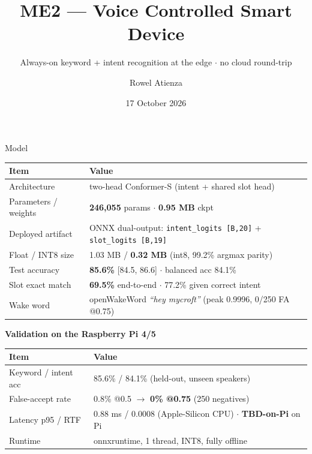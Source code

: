 \documentclass[aspectratio=169,10pt]{beamer}
\title[ME2 VCM]{ME2 --- Voice Controlled Smart Device}
\subtitle{Always-on keyword + intent recognition at the edge $\cdot$ no cloud round-trip}
\author{Rowel Atienza}
\date{17 October 2026}
\institute{Model \& Dataset \& Training on NVIDIA A100 \& Validation on RPi 4/5}
\newcommand{\TBD}{\textcolor{tbdgray}{\textbf{TBD-on-Pi}}}
\begin{document}
\begin{frame}{Model}
\small
\begin{table}
\centering
\begin{tabular}{@{}ll@{}}
\toprule
\textbf{Item} & \textbf{Value} \\
\midrule
Architecture & two-head Conformer-S (intent + shared slot head) \\
Parameters / weights & \textbf{246,055} params $\cdot$ \textbf{0.95 MB} ckpt \\
Deployed artifact & ONNX dual-output: \texttt{intent\_logits [B,20]} + \texttt{slot\_logits [B,19]} \\
Float / INT8 size & 1.03 MB / \textbf{0.32 MB} (int8, 99.2\% argmax parity) \\
Test accuracy & \textbf{85.6\%} [84.5, 86.6] $\cdot$ balanced acc 84.1\% \\
Slot exact match & \textbf{69.5\%} end-to-end $\cdot$ 77.2\% given correct intent \\
Wake word & openWakeWord \emph{``hey mycroft''} (peak 0.9996, 0/250 FA @0.75) \\
\bottomrule
\end{tabular}
\end{table}

\vspace{0.4em}
\textbf{Validation on the Raspberry Pi 4/5}
\begin{table}
\centering
\small
\begin{tabular}{@{}ll@{}}
\toprule
\textbf{Item} & \textbf{Value} \\
\midrule
Keyword / intent acc & 85.6\% / 84.1\% (held-out, unseen speakers) \\
False-accept rate & 0.8\% @0.5 $\rightarrow$ \textbf{0\% @0.75} (250 negatives) \\
Latency p95 / RTF & 0.88 ms / 0.0008 (Apple-Silicon CPU) $\cdot$ \TBD{} on Pi \\
Runtime & onnxruntime, 1 thread, INT8, fully offline \\
\bottomrule
\end{tabular}
\end{table}
\end{frame}
\end{document}
